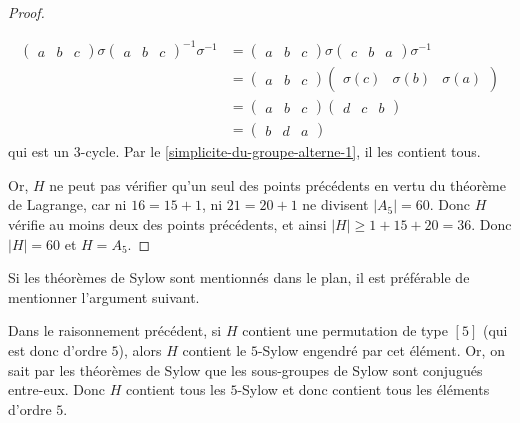 \begin{proof}
\begin{itemize}
			\begin{align*}
				\begin{pmatrix} a & b & c \end{pmatrix} \sigma \begin{pmatrix} a & b & c \end{pmatrix}^{-1} \sigma^{-1} &= \begin{pmatrix} a & b & c \end{pmatrix} \sigma \begin{pmatrix} c & b & a \end{pmatrix} \sigma^{-1} \\
				&= \begin{pmatrix} a & b & c \end{pmatrix} \begin{pmatrix} \sigma(c) & \sigma(b) & \sigma(a) \end{pmatrix} \\
				&= \begin{pmatrix} a & b & c \end{pmatrix} \begin{pmatrix} d & c & b \end{pmatrix} \\
				&= \begin{pmatrix} b & d & a \end{pmatrix}
			\end{align*}
			qui est un $3$-cycle. Par le \cref{simplicite-du-groupe-alterne-1}, il les contient tous.
		\end{itemize}
		Or, $H$ ne peut pas vérifier qu'un seul des points précédents en vertu du théorème de Lagrange, car ni $16 = 15 + 1$, ni $21 = 20 + 1$ ne divisent $|A_5| = 60$. Donc $H$ vérifie au moins deux des points précédents, et ainsi $|H| \geq 1 + 15 + 20 = 36$. Donc $|H|=60$ et $H = A_5$.
	\end{proof}


	Si les théorèmes de Sylow sont mentionnés dans le plan, il est préférable de mentionner l'argument suivant.

	\begin{remark}
		Dans le raisonnement précédent, si $H$ contient une permutation de type $[5]$ (qui est donc d'ordre $5$), alors $H$ contient le $5$-Sylow engendré par cet élément. Or, on sait par les théorèmes de Sylow que les sous-groupes de Sylow sont conjugués entre-eux. Donc $H$ contient tous les $5$-Sylow et donc contient tous les éléments d'ordre $5$.
	\end{remark}

